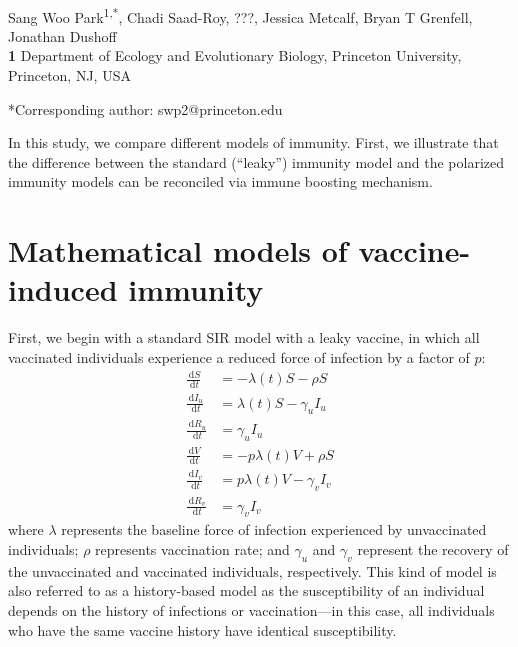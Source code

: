 \documentclass[12pt]{article}
\date{\today}
\newcommand{\dd}[1]{\ensuremath{\, \mathrm{d}#1}}
\begin{document}
\begin{flushleft}{
	\Large
	\textbf{}
}
\newline
\\
Sang Woo Park\textsuperscript{1,*}, Chadi Saad-Roy, ???, Jessica Metcalf, Bryan T Grenfell, Jonathan Dushoff
\\
\bigskip
\textbf{1} Department of Ecology and Evolutionary Biology, Princeton University, Princeton, NJ, USA
\\
\bigskip

*Corresponding author: swp2@princeton.edu
\end{flushleft}

In this study, we compare different models of immunity.
First, we illustrate that the difference between the standard (``leaky'') immunity model and the polarized immunity models can be reconciled via immune boosting mechanism.



\section{Mathematical models of vaccine-induced immunity}

First, we begin with a standard SIR model with a leaky vaccine, in which all vaccinated individuals experience a reduced force of infection by a factor of $p$:
\begin{align}
\frac{\dd S}{\dd t} &= - \lambda(t) S - \rho S \\
\frac{\dd I_u}{\dd t} &= \lambda(t) S - \gamma_u I_u \\
\frac{\dd R_u}{\dd t} &= \gamma_u I_u \\
\frac{\dd V}{\dd t} &= - p \lambda(t) V + \rho S \\
\frac{\dd I_v}{\dd t} &= p \lambda(t) V - \gamma_v I_v \\
\frac{\dd R_v}{\dd t} &= \gamma_v I_v
\end{align}
where $\lambda$ represents the baseline force of infection experienced by unvaccinated individuals; $\rho$ represents vaccination rate; and $\gamma_u$ and $\gamma_v $ represent the recovery of the unvaccinated and vaccinated individuals, respectively.
This kind of model is also referred to as a history-based model as the susceptibility of an individual depends on the history of infections or vaccination---in this case, all individuals who have the same vaccine history have identical susceptibility.
\end{document}
